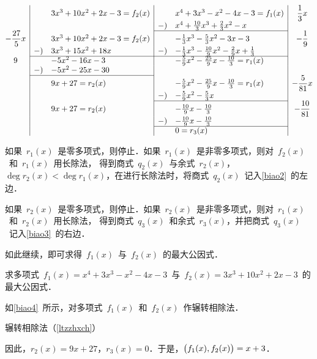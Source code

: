 \begin{lrbox}{\EuclidFour}
\setlength\arraycolsep{4pt}%
\begin{math}
\begin{array}{@{}c|cl|cl|c@{}}
&&3x^3+10x^2+2x-3=f_2(x)&&x^4+3x^3-x^2-4x-3=f_1(x)&\dfrac13x\\
&&&-)& x^4+\frac{10}3x^3+\frac23x^2-x&\\ \cline{4-5}
-\dfrac{27}5x&&3x^3+10x^2+2x-3=f_2(x)&&-\frac13x^3-\frac53x^2-3x-3& -\dfrac19\\
&-)&3x^3+15x^2+18x&-)& -\frac13x^3-\frac{10}9x^2-\frac29x+\frac13 & \\ \cline{2-5}
9&&-5x^2-16x-3&& -\frac59x^2-\frac{25}9x-\frac{10}3=r_1(x)&\\
&-)&-5x^2-25x-30&&&\\ \cline{2-3}
&&9x+27=r_2(x)&& -\frac59x^2-\frac{25}9x-\frac{10}3=r_1(x) & -\dfrac5{81}x\\
&&&-)& -\frac59x^2-\frac53x&\\ \cline{4-5}
&&9x+27=r_2(x)&& -\frac{10}9x-\frac{10}3&-\dfrac{10}{81}\\
&&&-)& -\frac{10}9x-\frac{10}3&\\ \cline{4-5}
&&&&0=r_3(x)&
\end{array}\end{math}
\end{lrbox}

\begin{table}
\begin{floatrow}
\tablebox{\caption{}\label{biao1}}
         {\usebox{\EuclidOne}}
\tablebox{\caption{}\label{biao2}}
         {\usebox{\EuclidTwo}}
\end{floatrow}
\end{table}

如果~$r_1(x)$~是零多项式，则停止．如果~$r_1(x)$~是非零多项式，则对~$f_2(x)$~和~$r_1(x)$~用长除法，
得到商式~$q_2(x)$~与余式~$r_2(x)$，$\deg r_2(x)<\deg r_1(x)$，在进行长除法时，将商式~$q_2(x)$~记入\ref{biao2}~的左边．%

\begin{table}
\usebox{\EuclidThree}
\caption{}\label{biao3}
\end{table}

如果~$r_2(x)$~是零多项式，则停止．如果~$r_2(x)$~是非零多项式，则对~$r_1(x)$~和~$r_2(x)$~用长除法，
得到商式~$q_3(x)$~和余式~$r_3(x)$，并把商式~$q_3(x)$~记入\ref{biao3}~的右边．%

如此继续，即可求得~$f_1(x)$~与~$f_2(x)$~的最大公因式．%

\begin{example}\label{ltzzhxch}
求多项式~$f_1(x)=x^4+3x^3-x^2-4x-3$~与~$f_2(x)=3x^3+10x^2+2x-3$~的最大公因式．
\end{example}
\begin{solution}
如\ref{biao4}~所示，对多项式~$f_1(x)$~和~$f_2(x)$~作辗转相除法．%

\begin{table}\centering
\usebox{\EuclidFour}
\caption{辗转相除法（\ref{ltzzhxch}）}\label{biao4}
\end{table}

因此，$r_2(x)=9x+27$，$r_3(x)=0$．于是，$\bigl(f_1(x),f_2(x)\bigr)=x+3$．
\end{solution}


